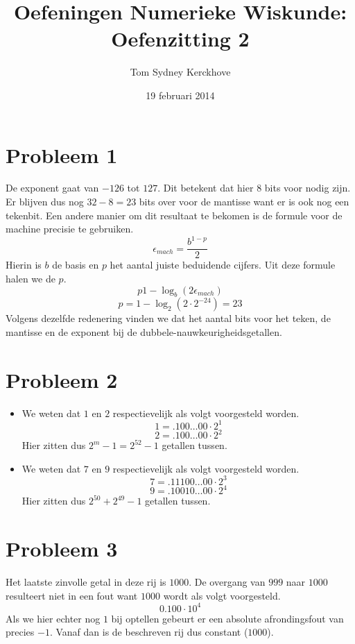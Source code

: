 \documentclass[12pt,a4paper]{article}
\author{Tom Sydney Kerckhove}
\title{Oefeningen Numerieke Wiskunde:\\ Oefenzitting 2}
\date{19 februari 2014}
\begin{document}
\maketitle

\section{Probleem 1}
De exponent gaat van $-126$ tot $127$. Dit betekent dat hier $8$ bits voor nodig zijn. Er blijven dus nog $32-8 = 23$ bits over voor de mantisse want er is ook nog een tekenbit.
Een andere manier om dit resultaat te bekomen is de formule voor de machine precisie te gebruiken.
\[
\epsilon_{mach} = \frac{b^{1-p}}{2}
\]
Hierin is $b$ de basis en $p$ het aantal juiste beduidende cijfers.
Uit deze formule halen we de $p$.
\[
p 1-\log_{b}(2\epsilon_{mach})
\]
\[
p = 1-\log_{2}(2\cdot 2^{-24}) = 23
\]
Volgens dezelfde redenering vinden we dat het aantal bits voor het teken, de mantisse en de exponent bij de dubbele-nauwkeurigheidsgetallen.

\section{Probleem 2}
\begin{itemize}
\item We weten dat $1$ en $2$ respectievelijk als volgt voorgesteld worden.
\[1 = .100\ldots00 \cdot 2^1\]
\[2 = .100\ldots00 \cdot 2^2\]
Hier zitten dus $2^m-1=2^{52}-1$ getallen tussen.
\item We weten dat $7$ en $9$ respectievelijk als volgt voorgesteld worden.
\[7 = .11100\ldots00 \cdot 2^3\]
\[9 = .10010\ldots00 \cdot 2^4\]
Hier zitten dus $2^{50}+2^{49}-1$ getallen tussen.
\end{itemize}

\section{Probleem 3}
Het laatste zinvolle getal in deze rij is $1000$. De overgang van $999$ naar $1000$ resulteert niet in een fout want $1000$ wordt als volgt voorgesteld.
\[0.100 \cdot 10^4\]
Als we hier echter nog $1$ bij optellen gebeurt er een absolute afrondingsfout van precies $-1$. Vanaf dan is de beschreven rij dus constant ($1000$).
\end{document}
